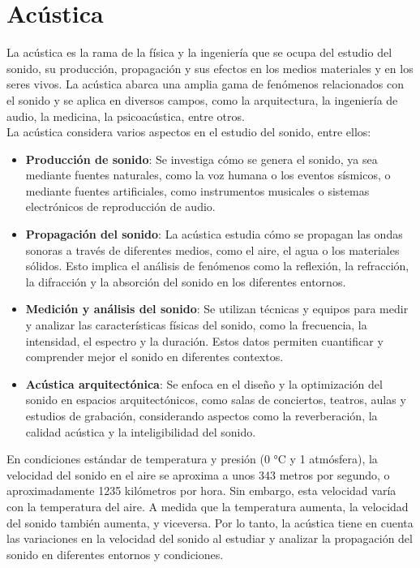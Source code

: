 \documentclass[
	12pt, %
	fleqn, %
	a4paper, %
	oneside, %
]{LegrandOrangeBook}
\begin{document}
\section{Acústica}
La acústica es la rama de la física y la ingeniería que se ocupa del estudio del sonido, su producción, propagación y sus efectos en los medios materiales y en los seres vivos. La acústica abarca una amplia gama de fenómenos relacionados con el sonido y se aplica en diversos campos, como la arquitectura, la ingeniería de audio, la medicina, la psicoacústica, entre otros.\\
La acústica considera varios aspectos en el estudio del sonido, entre ellos:
\begin{itemize}
\item \textbf{Producción de sonido}: Se investiga cómo se genera el sonido, ya sea mediante fuentes naturales, como la voz humana o los eventos sísmicos, o mediante fuentes artificiales, como instrumentos musicales o sistemas electrónicos de reproducción de audio.
\item \textbf{Propagación del sonido}: La acústica estudia cómo se propagan las ondas sonoras a través de diferentes medios, como el aire, el agua o los materiales sólidos. Esto implica el análisis de fenómenos como la reflexión, la refracción, la difracción y la absorción del sonido en los diferentes entornos.
\item \textbf{Medición y análisis del sonido}: Se utilizan técnicas y equipos para medir y analizar las características físicas del sonido, como la frecuencia, la intensidad, el espectro y la duración. Estos datos permiten cuantificar y comprender mejor el sonido en diferentes contextos.
\item \textbf{Acústica arquitectónica}: Se enfoca en el diseño y la optimización del sonido en espacios arquitectónicos, como salas de conciertos, teatros, aulas y estudios de grabación, considerando aspectos como la reverberación, la calidad acústica y la inteligibilidad del sonido.
\end{itemize}
En condiciones estándar de temperatura y presión (0 °C y 1 atmósfera), la velocidad del sonido en el aire se aproxima a unos 343 metros por segundo, o aproximadamente 1235 kilómetros por hora. Sin embargo, esta velocidad varía con la temperatura del aire. A medida que la temperatura aumenta, la velocidad del sonido también aumenta, y viceversa. Por lo tanto, la acústica tiene en cuenta las variaciones en la velocidad del sonido al estudiar y analizar la propagación del sonido en diferentes entornos y condiciones.
\end{document}
